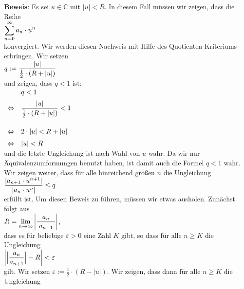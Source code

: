 \noindent
\textbf{Beweis}:
Es sei $u \in \mathbb{C}$ mit $|u| < R$.  In diesem Fall m\"ussen wir zeigen, dass die Reihe
\\[0.2cm]
\hspace*{1.3cm}
$\displaystyle\sum\limits_{n=0}^\infty a_n\cdot u^n$
\\[0.2cm]
 konvergiert.  Wir werden diesen Nachweis mit Hilfe des
Quotienten-Kriteriums erbringen.  Wir setzen
\\[0.2cm]
\hspace*{1.3cm}
 $\displaystyle q := \frac{|u|}{\frac{1}{2} \cdot (R + |u|)}$ 
\\[0.2cm] 
und zeigen, dass $q < 1$ ist:
\\[0.2cm]
\hspace*{1.3cm}
$
\begin{array}[t]{cl}
                & q < 1 \\[0.2cm]
\Leftrightarrow &\displaystyle \frac{|u|}{\frac{1}{2} \cdot (R + |u|)} < 1  \\[0.8cm] 
\Leftrightarrow & 2 \cdot |u| < R + |u|                        \\[0.2cm]  
\Leftrightarrow & |u| < R                         
\end{array}
$
\\[0.2cm]
und die letzte Ungleichung ist nach Wahl von $u$ wahr.  Da wir nur \"Aquivalenzumformungen benutzt
haben, ist damit auch die Formel $q < 1$ wahr.  Wir zeigen weiter,  dass f\"ur
alle hinreichend gro\ss{}en $n$ die Ungleichung 
      \\[0.2cm]
      \hspace*{1.3cm}      
      $\displaystyle\frac{|a_{n+1}\cdot u^{n+1}|}{|a_{n}\cdot u^{n}|} \leq q$
      \\[0.2cm]
erf\"ullt ist.  Um diesen Beweis zu f\"uhren, m\"ussen wir etwas ausholen.  Zun\"achst folgt aus 
      \\[0.2cm]
      \hspace*{1.3cm}      
       $\displaystyle R = \lim\limits_{n\rightarrow\infty} \left|\frac{a_n}{\;a_{n+1}\;}\right|$,
      \\[0.2cm]
dass es f\"ur beliebige $\varepsilon >0$ eine Zahl $K$ gibt, so dass f\"ur alle $n \geq K$
die Ungleichung
\\[0.2cm]
\hspace*{1.3cm}      
$\displaystyle\left| \Bigl|\frac{a_{n}}{a_{n+1}}\Bigr| - R \right| < \varepsilon$
\\[0.2cm]
gilt.  Wir setzen $\varepsilon := \frac{1}{2}\cdot(R - |u|)$. Wir zeigen, dass dann f\"ur alle 
$n \geq K$ die Ungleichung
\\
